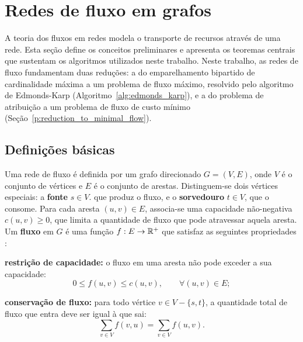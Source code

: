 

\section{Redes de fluxo em grafos}

A teoria dos fluxos em redes modela o transporte de recursos através de uma rede. Esta seção define os conceitos preliminares e apresenta os teoremas centrais que sustentam os algoritmos utilizados neste trabalho. Neste trabalho, as redes de fluxo fundamentam duas reduções: a do emparelhamento bipartido de cardinalidade máxima a um problema de fluxo máximo, resolvido pelo algoritmo de Edmonds-Karp (Algoritmo~\ref{alg:edmonds_karp}), e a do problema de atribuição a um problema de fluxo de custo mínimo (Seção~\ref{p:reduction_to_minimal_flow}).

\subsection{Definições básicas}

Uma rede de fluxo é definida por um grafo direcionado $G = (V, E)$, onde $V$ é o conjunto de vértices e $E$ é o conjunto de arestas. Distinguem-se dois vértices especiais: a \textbf{fonte} $s\in V$. que produz o fluxo, e o \textbf{sorvedouro} $t\in V$, que o consome. Para cada aresta $(u, v) \in E$, associa-se uma capacidade não-negativa $c(u,v) \geq 0$, que limita a quantidade de fluxo que pode atravessar aquela aresta. Um \textbf{fluxo} em $G$ é uma função $f \space : \space E \rightarrow \mathbb{R}^+$ que satisfaz as seguintes propriedades \cite{cormen}:

\begin{alineas}
    \item \textbf{restrição de capacidade:} o fluxo em uma aresta não pode exceder a sua capacidade:
    \begin{equation}
        \label{eq:capacity_restraint}
        0 \leq f(u,v) \leq c(u,v), \qquad \forall(u,v) \in E;
    \end{equation}
    \item \textbf{conservação de fluxo:} para todo vértice $v \in V - \{s,t\}$, a quantidade total de fluxo que entra deve ser igual à que sai:
    \begin{equation}
        \sum_{v \in V}f(v,u) = \sum_{v \in V}f(u,v).
    \end{equation}
\end{alineas}

